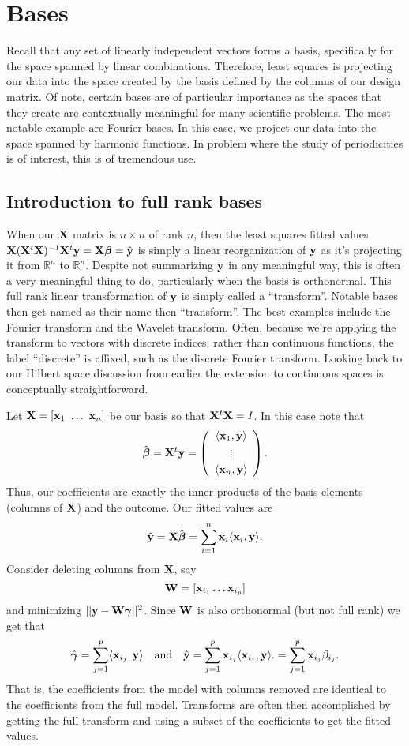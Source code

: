 \chapter{Bases}

Recall that any set of linearly independent vectors forms a basis,
specifically for the space spanned by linear combinations. Therefore,
least squares is projecting our data into the space created by
the basis defined by the columns of our design matrix. Of note,
certain bases are of particular importance as the spaces that
they create are contextually meaningful for many scientific
problems. The most notable example are Fourier bases. In this
case, we project our data into the space spanned by harmonic
functions. In problem where the study of periodicities is 
of interest, this is of tremendous use.

\section{Introduction to full rank bases}
When our $\mathbf{X}$ matrix is $n\times n$ of rank $n$, then the least squares
fitted values $\mathbf{X} (\mathbf{X}^t \mathbf{X})^{-1} \mathbf{X}^t \mathbf{y} = \mathbf{X} \boldsymbol{\beta} = \hat {\mathbf{y}}$ is simply a linear reorganization
of $\mathbf{y}$ as it's projecting it from $\mathbb{R}^n$ to $\mathbb{R}^n$. 
Despite not summarizing $\mathbf{y}$ in any meaningful way, this is often
a very meaningful thing to do, particularly when the basis is orthonormal.
This full rank linear transformation of $\mathbf{y}$ is simply called a 
``transform''. Notable bases then get named as their name then ``transform''. 
The best examples include the Fourier transform and the Wavelet transform.
Often, because we're applying the transform to vectors with discrete
indices, rather than continuous functions, the label ``discrete'' is
affixed, such as the discrete Fourier transform. Looking back to
our Hilbert space discussion from earlier the extension to continuous
spaces is conceptually straightforward. 

Let $\mathbf{X} = [\mathbf{x}_1 ~ \ldots ~ \mathbf{x}_n]$ be our basis so that 
$\mathbf{X}^t \mathbf{X} = I$. In this case note that 
$$
\hat {\boldsymbol{\beta}}
= \mathbf{X}^t \mathbf{y} 
= 
\left(
\begin{array}{c}
 \langle \mathbf{x}_1, \mathbf{y} \rangle \\
 \vdots \\
 \langle \mathbf{x}_n, \mathbf{y} \rangle
\end{array}
\right).
$$
Thus, our coefficients are exactly the inner products of the basis elements (columns of $\mathbf{X}$) and the outcome. Our fitted values are
$$
\hat {\mathbf{y}} = \mathbf{X} \hat {\boldsymbol{\beta}} = \sum_{i=1}^n \mathbf{x}_i \langle \mathbf{x}_i, \mathbf{y} \rangle.
$$
Consider deleting columns from $\mathbf{X}$, say 
$$
\mathbf{W} = [\mathbf{x}_{i_1} \ldots \mathbf{x}_{i_p}]
$$
and minimizing $||\mathbf{y} - \mathbf{W} \boldsymbol{\gamma}||^2$. Since $\mathbf{W}$ is also orthonormal (but not full rank) we get that 
$$
\hat {\boldsymbol{\gamma}} = \sum_{j=1}^p \langle \mathbf{x}_{i_j}, \mathbf{y} \rangle ~~~
\mbox{and} ~~~
\hat {\mathbf{y}} = \sum_{j=1}^p \mathbf{x}_{i_j} \langle \mathbf{x}_{i_j}, \mathbf{y} \rangle.
=  \sum_{j=1}^p \mathbf{x}_{i_j} \beta_{i_j}.
$$
That is, the coefficients from the model with columns removed are identical
to the coefficients from the full model. Transforms are often then
accomplished by getting the full transform and using a subset of the 
coefficients to get the fitted values. 


